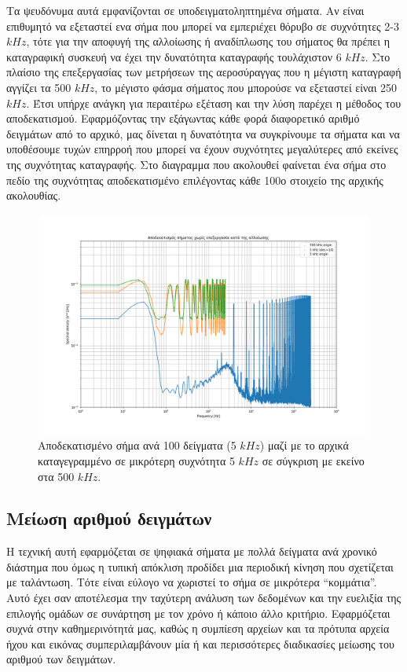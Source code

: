 \documentclass[breaklines=true, 12pt]{article}
\begin{document}
Τα ψευδόνυμα αυτά εμφανίζονται σε υποδειγματοληπτημένα σήματα. Αν είναι επιθυμητό
να εξεταστεί ενα σήμα που μπορεί να εμπεριέχει θόρυβο σε συχνότητες 2-3 \(kHz\), τότε για
την αποφυγή της αλλοίωσης ή αναδίπλωσης του σήματος θα πρέπει η καταγραφική συσκευή
να έχει την δυνατότητα καταγραφής τουλάχιστον 6 \(kHz\). Στο πλαίσιο της επεξεργασίας των
μετρήσεων της αεροσύραγγας που η μέγιστη καταγραφή αγγίζει τα 500 \(kHz\), το μέγιστο
φάσμα σήματος που μπορούσε να εξεταστεί είναι 250 \(kHz\). Έτσι υπήρχε ανάγκη για
περαιτέρω εξέταση και την λύση παρέχει η μέθοδος του αποδεκατισμού. Εφαρμόζοντας την
εξάγωντας κάθε φορά διαφορετικό αριθμό δειγμάτων από το αρχικό, μας δίνεται η
δυνατότητα να συγκρίνουμε τα σήματα και να υποθέσουμε τυχών επηρροή που μπορεί να
έχουν συχνότητες μεγαλύτερες από εκείνες της συχνότητας καταγραφής. Στο διαγραμμα
που ακολουθεί φαίνεται ένα σήμα στο πεδίο της συχνότητας αποδεκατισμένο επιλέγοντας
κάθε 100ο στοιχείο της αρχικής ακολουθίας.

\begin{figure}[htbp]
\centering
\includegraphics[width=500px,height=280px]{./decimation/with_aliasing.png}
\caption{Αποδεκατισμένο σήμα ανά 100 δείγματα (5 \(kHz\)) μαζί με το αρχικά καταγεγραμμένο σε μικρότερη συχνότητα 5 \(kHz\) σε σύγκριση με εκείνο στα 500 \(kHz\).}
\end{figure}
\subsection{Μείωση αριθμού δειγμάτων}
\label{sec:orgec8e9a3}
Η τεχνική αυτή εφαρμόζεται σε ψηφιακά σήματα με πολλά δείγματα ανά
χρονικό διάστημα που όμως η τυπική απόκλιση προδίδει μια περιοδική
κίνηση που σχετίζεται με ταλάντωση. Τότε είναι εύλογο να χωριστεί το
σήμα σε μικρότερα “κομμάτια”. Αυτό έχει σαν αποτέλεσμα την ταχύτερη
ανάλυση των δεδομένων και την ευελιξία της επιλογής ομάδων σε συνάρτηση
με τον χρόνο ή κάποιο άλλο κριτήριο. Εφαρμόζεται συχνά στην
καθημερινότητά μας, καθώς η συμπίεση αρχείων και τα πρότυπα αρχεία ήχου
και εικόνας συμπεριλαμβάνουν μία ή και περισσότερες διαδικασίες μείωσης
του αριθμού των δειγμάτων.
\end{document}
